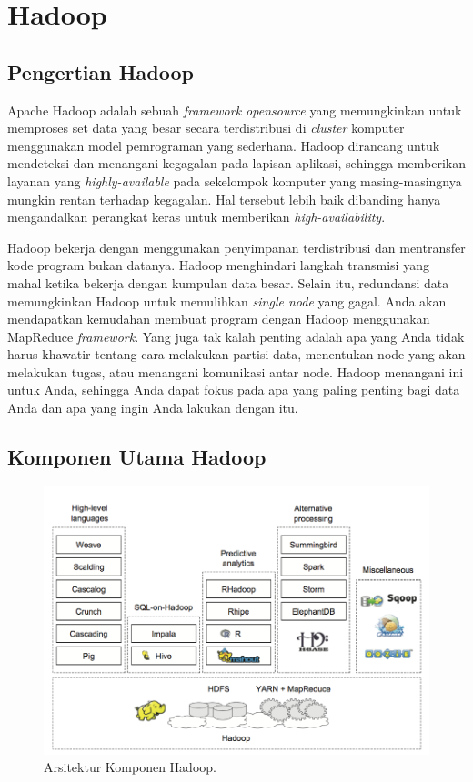 \section{Hadoop}
\label{sec:hadoop}

\subsection{Pengertian Hadoop}
\label{sec:pengertian_hadoop}
Apache Hadoop adalah sebuah \textit{framework opensource} yang memungkinkan untuk memproses set data yang besar secara terdistribusi di \textit{cluster} komputer menggunakan model pemrograman yang sederhana. Hadoop dirancang untuk mendeteksi dan menangani kegagalan pada lapisan aplikasi, sehingga memberikan layanan yang \textit{highly-available} pada sekelompok komputer yang masing-masingnya mungkin rentan terhadap kegagalan. Hal tersebut lebih baik dibanding hanya mengandalkan perangkat keras untuk memberikan \textit{high-availability}.

Hadoop bekerja dengan menggunakan penyimpanan terdistribusi dan mentransfer kode program bukan datanya. Hadoop menghindari langkah transmisi yang mahal ketika bekerja dengan kumpulan data besar. Selain itu, redundansi data memungkinkan Hadoop untuk memulihkan \textit{single node} yang gagal. Anda akan mendapatkan kemudahan membuat program dengan Hadoop menggunakan MapReduce \textit{framework}. Yang juga tak kalah penting adalah apa yang Anda tidak harus khawatir tentang cara melakukan partisi data, menentukan node yang akan melakukan tugas, atau menangani komunikasi antar node. Hadoop menangani ini untuk Anda, sehingga Anda dapat fokus pada apa yang paling penting bagi data Anda dan apa yang ingin Anda lakukan dengan itu.

\subsection{Komponen Utama Hadoop}
\label{sec:komponen_utama_hadoop}
\begin{figure}
	\centering
	\includegraphics[scale=0.5]{Gambar/hadoop-architecture.png}
	\caption[Arsitektur Komponen Hadoop]{Arsitektur Komponen Hadoop.\cite{holmes2012hadoop}} 
\end{figure}

